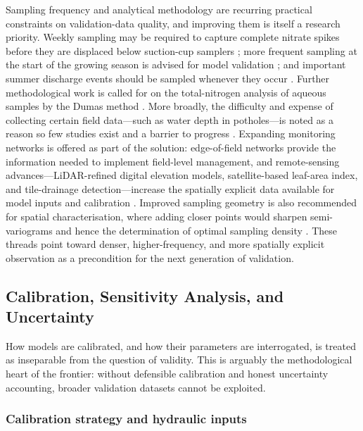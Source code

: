 Sampling frequency and analytical methodology are recurring practical constraints on validation-data quality, and improving them is itself a research priority. Weekly sampling may be required to capture complete nitrate spikes before they are displaced below suction-cup samplers \parencite{Zotarelli2007}; more frequent sampling at the start of the growing season is advised for model validation \parencite{Kalita1998}; and important summer discharge events should be sampled whenever they occur \parencite{Tiemeyer2009}. Further methodological work is called for on the total-nitrogen analysis of aqueous samples by the Dumas method \parencite{Schindler1999}. More broadly, the difficulty and expense of collecting certain field data---such as water depth in potholes---is noted as a reason so few studies exist and a barrier to progress \parencite{Upadhyay2019}. Expanding monitoring networks is offered as part of the solution: edge-of-field networks provide the information needed to implement field-level management, and remote-sensing advances---LiDAR-refined digital elevation models, satellite-based leaf-area index, and tile-drainage detection---increase the spatially explicit data available for model inputs and calibration \parencite{Apostel2021}. Improved sampling geometry is also recommended for spatial characterisation, where adding closer points would sharpen semi-variograms and hence the determination of optimal sampling density \parencite{GALLICHAND1992}. These threads point toward denser, higher-frequency, and more spatially explicit observation as a precondition for the next generation of validation.

\subsection{Calibration, Sensitivity Analysis, and Uncertainty}

How models are calibrated, and how their parameters are interrogated, is treated as inseparable from the question of validity. This is arguably the methodological heart of the frontier: without defensible calibration and honest uncertainty accounting, broader validation datasets cannot be exploited.

\subsubsection{Calibration strategy and hydraulic inputs}

